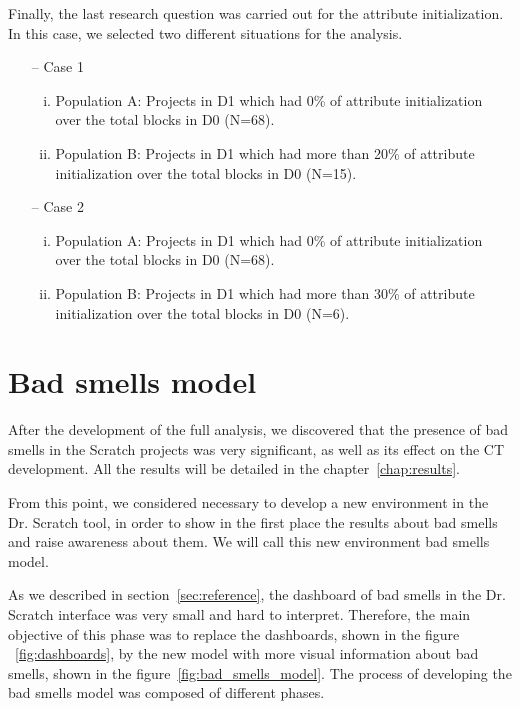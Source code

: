 Finally, the last research question was carried out for the attribute initialization. In this case, we selected two different situations for the analysis. 

\begin{itemize}
    \item[--] Case 1
    \begin{enumerate}[(i)]
        \item Population A: Projects in D1 which had 0\% of attribute initialization over the total blocks in D0 (N=68).
        \item Population B: Projects in D1 which had more than 20\% of attribute initialization over the total blocks in D0 (N=15).
    \end{enumerate}
    \item[--] Case 2
    \begin{enumerate}[(i)]
        \item Population A: Projects in D1 which had 0\% of attribute initialization over the total blocks in D0 (N=68).
        \item Population B: Projects in D1 which had more than 30\% of attribute initialization over the total blocks in D0 (N=6).
    \end{enumerate}
\end{itemize}


\section{Bad smells model}
\label{sec:badsmells}

After the development of the full analysis, we discovered that the presence of bad smells in the Scratch projects was very significant, as well as its effect on the CT development. All the results will be detailed in the chapter~\ref{chap:results}. 

From this point, we considered necessary to develop a new environment in the Dr. Scratch tool, in order to show in the first place the results about bad smells and raise awareness about them. We will call this new environment bad smells model. 

As we described in section~\ref{sec:reference}, the dashboard of bad smells in the Dr. Scratch interface was very small and hard to interpret. Therefore, the main objective of this phase was to replace the dashboards, shown in the figure ~\ref{fig:dashboards}, by the new model with more visual information about bad smells, shown in the figure~\ref{fig:bad_smells_model}. The process of developing the bad smells model was composed of different phases.

